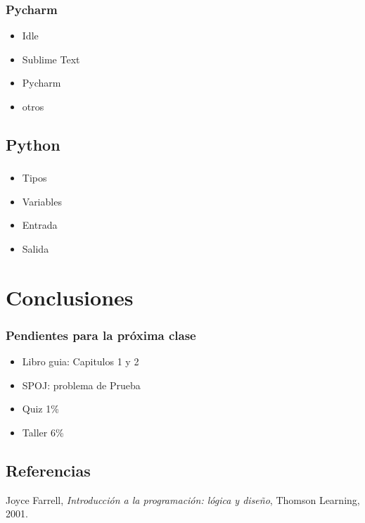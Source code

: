 \documentclass[xcolor=svgnames]{beamer}
\theoremstyle{example}
\begin{document}
\begin{frame}
  \frametitle{Pycharm}
  \begin{itemize}
    \item Idle
    \item Sublime Text
    \item Pycharm
    \item otros
  \end{itemize}
\end{frame}

\subsection{Python}


\begin{frame}
  \frametitle{}
  \begin{itemize}
    \item Tipos
    \item Variables
    \item Entrada
    \item Salida
  \end{itemize}
\end{frame}





\section{Conclusiones}

\begin{frame}
  \frametitle{Pendientes para la próxima clase}
  \begin{itemize}
  \item{Libro guia: Capitulos 1 y 2}
    \item{SPOJ: problema de Prueba}
  \item{Quiz 1\%}
  \item{Taller 6\%}
  \end{itemize}
\end{frame}


\subsection{Referencias}

\begin{thebibliography}{9}
  Joyce Farrell,
 \emph{Introducción a la programación: lógica y diseño},
  Thomson Learning,
  2001.
 
\end{thebibliography}
\end{document}
